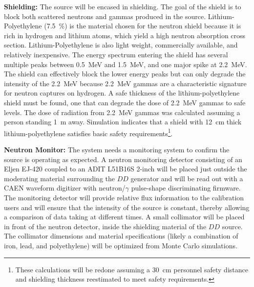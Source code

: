{\bf Shielding:} The source will be encased in shielding. The goal of the shield is to block both scattered neutrons and gammas produced in the source. Lithium-Polyethylene (\SI{7.5}{\%}) is the material chosen for the neutron shield because it is rich in hydrogen and lithium atoms, which yield a high neutron absorption cross section. Lithium-Polyethylene is also light weight, commercially available, and relatively inexpensive. The energy spectrum entering the shield has several multiple peaks between \SI{0.5}{\MeV} and \SI{1.5}{\MeV}, and one major spike at \SI{2.2}{\MeV}. The shield can effectively block the lower energy peaks but can only degrade the intensity of the \SI{2.2}{\MeV} because \SI{2.2}{\MeV} gammas are a characteristic signature for neutron captures on hydrogen. A safe thickness of the lithium-polyethylene shield must be found, one that can degrade the dose of \SI{2.2}{\MeV} gammas to safe levels. The dose of radiation from \SI{2.2}{\MeV} gammas was calculated assuming a person standing \SI{1}{\m} away. Simulation indicates that a shield with \SI{12}{\cm} thick lithium-polyethylene satisfies basic safety requirements\footnote{These calculations will be redone assuming a \SI{30}{\cm} personnel safety distance and shielding thickness reestimated to meet  safety requirements.}. 

{\bf Neutron Monitor:} The system needs a monitoring system to confirm the source is operating as expected.  A neutron monitoring detector consisting of an Eljen EJ-420 coupled to an ADIT L51B16S \num{2}-inch  will be placed just outside the moderating material surrounding the $DD$ generator and will be read out with a CAEN waveform digitizer with neutron/$\gamma$ pulse-shape discriminating firmware. The monitoring detector will provide relative flux information to the calibration users and will ensure that the intensity of the source is constant, thereby allowing a comparison of data taking at different times.  A small collimator will be placed in front of the neutron detector, inside the shielding material of the $DD$ source. The collimator dimensions and material specifications (likely a combination of iron, lead, and polyethylene) will be optimized from Monte Carlo simulations.

